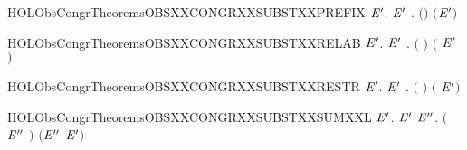 \newcommand{\HOLObsCongrTheoremsOBSXXCONGRXXSUBSTXXPARXXR}{\UseVerbatim{HOLObsCongrTheoremsOBSXXCONGRXXSUBSTXXPARXXR}}
\begin{SaveVerbatim}{HOLObsCongrTheoremsOBSXXCONGRXXSUBSTXXPREFIX}
\HOLTokenTurnstile{} \HOLSymConst{\HOLTokenForall{}} \ensuremath{\HOLBoundVar{E}\sp{\prime}}.   \ensuremath{\HOLBoundVar{E}\sp{\prime}} \HOLSymConst{\HOLTokenImp{}} \HOLSymConst{\HOLTokenForall{}}.  \ensuremath{(}\HOLSymConst{\ensuremath{\ldotp}}\ensuremath{)} \ensuremath{(}\HOLSymConst{\ensuremath{\ldotp}}\ensuremath{\HOLBoundVar{E}\sp{\prime}}\ensuremath{)}
\end{SaveVerbatim}
\newcommand{\HOLObsCongrTheoremsOBSXXCONGRXXSUBSTXXPREFIX}{\UseVerbatim{HOLObsCongrTheoremsOBSXXCONGRXXSUBSTXXPREFIX}}
\begin{SaveVerbatim}{HOLObsCongrTheoremsOBSXXCONGRXXSUBSTXXRELAB}
\HOLTokenTurnstile{} \HOLSymConst{\HOLTokenForall{}} \ensuremath{\HOLBoundVar{E}\sp{\prime}}.
         \ensuremath{\HOLBoundVar{E}\sp{\prime}} \HOLSymConst{\HOLTokenImp{}}
       \HOLSymConst{\HOLTokenForall{}}.  \ensuremath{(}  \ensuremath{)} \ensuremath{(} \ensuremath{\HOLBoundVar{E}\sp{\prime}} \ensuremath{)}
\end{SaveVerbatim}
\newcommand{\HOLObsCongrTheoremsOBSXXCONGRXXSUBSTXXRELAB}{\UseVerbatim{HOLObsCongrTheoremsOBSXXCONGRXXSUBSTXXRELAB}}
\begin{SaveVerbatim}{HOLObsCongrTheoremsOBSXXCONGRXXSUBSTXXRESTR}
\HOLTokenTurnstile{} \HOLSymConst{\HOLTokenForall{}} \ensuremath{\HOLBoundVar{E}\sp{\prime}}.   \ensuremath{\HOLBoundVar{E}\sp{\prime}} \HOLSymConst{\HOLTokenImp{}} \HOLSymConst{\HOLTokenForall{}}.  \ensuremath{(}  \ensuremath{)} \ensuremath{(}  \ensuremath{\HOLBoundVar{E}\sp{\prime}}\ensuremath{)}
\end{SaveVerbatim}
\newcommand{\HOLObsCongrTheoremsOBSXXCONGRXXSUBSTXXRESTR}{\UseVerbatim{HOLObsCongrTheoremsOBSXXCONGRXXSUBSTXXRESTR}}
\begin{SaveVerbatim}{HOLObsCongrTheoremsOBSXXCONGRXXSUBSTXXSUMXXL}
\HOLTokenTurnstile{} \HOLSymConst{\HOLTokenForall{}} \ensuremath{\HOLBoundVar{E}\sp{\prime}}.   \ensuremath{\HOLBoundVar{E}\sp{\prime}} \HOLSymConst{\HOLTokenImp{}} \HOLSymConst{\HOLTokenForall{}}\ensuremath{\HOLBoundVar{E}\sp{\prime\prime}}.  \ensuremath{(}\ensuremath{\HOLBoundVar{E}\sp{\prime\prime}} \HOLSymConst{\ensuremath{+}} \ensuremath{)} \ensuremath{(}\ensuremath{\HOLBoundVar{E}\sp{\prime\prime}} \HOLSymConst{\ensuremath{+}} \ensuremath{\HOLBoundVar{E}\sp{\prime}}\ensuremath{)}
\end{SaveVerbatim}
